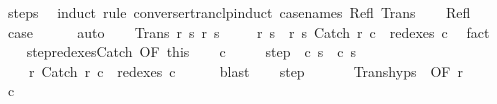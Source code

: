 \begin{isabellebody}
%
\isatagproof
{}\isamarkupfalse%
\ steps\ \isanewline
{}\isamarkupfalse%
\ {\isacharparenleft}induct\ rule{\isacharcolon}\ converse{\isacharunderscore}rtranclp{\isacharunderscore}induct{}\ {\isacharbrackleft}case{\isacharunderscore}names\ Refl\ Trans{\isacharbrackright}{\isacharparenright}\isanewline
\ \ \isamarkupfalse%
\ Refl\isanewline
\ \ \isamarkupfalse%
\ \isamarkupfalse%
\ {\isacharquery}case\isanewline
\ \ \ \ \isamarkupfalse%
\ {\isacharparenleft}auto{\isacharparenright}\isanewline
\isanewline
{}\isamarkupfalse%
\isanewline
\ \ \isamarkupfalse%
\ {\isacharparenleft}Trans\ r\ s\ r{\isacharprime}{\isacharprime}\ s{\isacharprime}{\isacharprime}{\isacharparenright}\isanewline
\ \ \isamarkupfalse%
\ {\isachardoublequoteopen}{\isasymGamma}{\isasymturnstile}\ {\isacharparenleft}r{\isacharcomma}\ s{\isacharparenright}\ {\isasymrightarrow}\ {\isacharparenleft}r{\isacharprime}{\isacharprime}{\isacharcomma}\ s{\isacharprime}{\isacharprime}{\isacharparenright}{\isachardoublequoteclose}\ {\isachardoublequoteopen}Catch\ r\ c\ {\isasymin}\ redexes\ c{\isachardoublequoteclose}\ \isamarkupfalse%
\ fact{\isacharplus}\isanewline
\ \ \isamarkupfalse%
\ step{\isacharunderscore}redexes{\isacharunderscore}Catch\ {\isacharbrackleft}OF\ this{\isacharbrackright}\isanewline
\ \ \isamarkupfalse%
\ c{\isacharprime}\ \isanewline
\ \ \ \ step{\isacharcolon}\ {\isachardoublequoteopen}{\isasymGamma}{\isasymturnstile}\ {\isacharparenleft}c{\isacharcomma}\ s{\isacharparenright}\ {\isasymrightarrow}\ {\isacharparenleft}c{\isacharprime}{\isacharcomma}\ s{\isacharprime}{\isacharprime}{\isacharparenright}{\isachardoublequoteclose}\ \isanewline
\ \ \ \ r{\isacharprime}{\isacharprime}{\isacharcolon}\ {\isachardoublequoteopen}Catch\ r{\isacharprime}{\isacharprime}\ c\ {\isasymin}\ redexes\ c{\isacharprime}{\isachardoublequoteclose}\isanewline
\ \ \ \ \isamarkupfalse%
\ blast\isanewline
\ \ \isamarkupfalse%
\ step\isanewline
\ \ \isamarkupfalse%
\isanewline
\ \ \isamarkupfalse%
\ Trans{\isachardot}hyps\ {\isacharparenleft}{}{\isacharparenright}\ {\isacharbrackleft}OF\ r{\isacharprime}{\isacharprime}{\isacharbrackright}\isanewline
\ \ \isamarkupfalse%
\ c{\isacharprime}{\isacharprime}\ \isanewline

\end{isabellebody}
